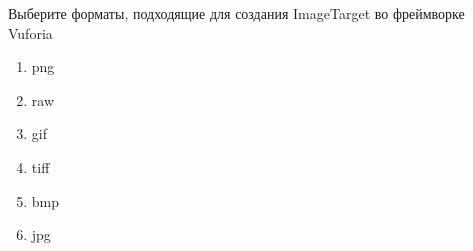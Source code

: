
Выберите форматы, подходящие для создания ImageTarget во фреймворке Vuforia

\begin{enumerate}
    \item png
    \item raw
    \item gif
    \item tiff
    \item bmp
    \item jpg
\end{enumerate}

